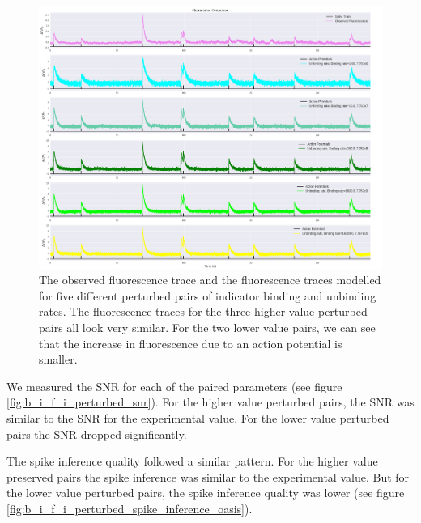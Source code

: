 \documentclass[a4paper,12pt]{article}
\theoremstyle{definition}
\begin{document}
\begin{figure}[ht]
  \centering
  \includegraphics[width=\textwidth]{figures/b_peturbed_fluorescence_18.png}
  \caption{The observed fluorescence trace and the fluorescence traces modelled for five different perturbed pairs of indicator binding and unbinding rates. The fluorescence traces for the three higher value perturbed pairs all look very similar. For the two lower value pairs, we can see that the increase in fluorescence due to an action potential is smaller.}
  \label{fig:b_peturbed_fluorescence}
\end{figure}

We measured the SNR for each of the paired parameters (see figure \ref{fig:b_i_f_i_perturbed_snr}). For the higher value perturbed pairs, the SNR was similar to the SNR for the experimental value. For the lower value perturbed pairs the SNR dropped significantly.

The spike inference quality followed a similar pattern. For the higher value preserved pairs the spike inference was similar to the experimental value. But for the lower value perturbed pairs, the spike inference quality was lower (see figure \ref{fig:b_i_f_i_perturbed_spike_inference_oasis}).
\end{document}
